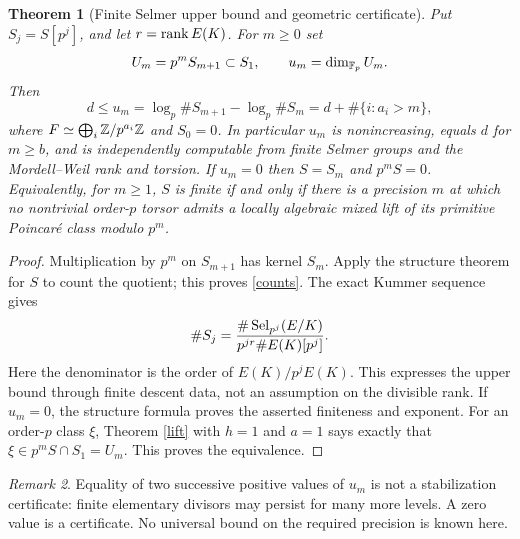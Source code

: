 \documentclass[11pt,a4paper]{article}
\newtheorem{theorem}{Theorem}[section]\newtheorem{lemma}[theorem]{Lemma}\newtheorem{corollary}[theorem]{Corollary}\newtheorem{proposition}[theorem]{Proposition}
\theoremstyle{remark}\newtheorem{remark}[theorem]{Remark}
\begin{document}
\begin{theorem}[Finite Selmer upper bound and geometric certificate]\label{certificate}
Put $S_j=S[p^j]$, and let $r=\operatorname{rank} E(K)$. For $m\ge0$ set
\[
 U_m=p^mS_{m+1}\subset S_1,\qquad u_m=\dim_{\mathbb F_p}U_m.
\]
Then
\begin{equation}\label{counts}
 d\le u_m=\log_p\#S_{m+1}-\log_p\#S_m
 =d+\#\{i:a_i>m\},
\end{equation}
where $F\simeq\bigoplus_i\mathbb Z/p^{a_i}\mathbb Z$ and $S_0=0$. In particular $u_m$ is nonincreasing, equals $d$ for $m\ge b$, and is independently computable from finite Selmer groups and the Mordell--Weil rank and torsion. If $u_m=0$ then $S=S_m$ and $p^mS=0$. Equivalently, for $m\ge1$, $S$ is finite if and only if there is a precision $m$ at which no nontrivial order-$p$ torsor admits a locally algebraic mixed lift of its primitive Poincar\'e class modulo $p^m$.
\end{theorem}
\begin{proof}
Multiplication by $p^m$ on $S_{m+1}$ has kernel $S_m$. Apply the structure theorem for $S$ to count the quotient; this proves \eqref{counts}. The exact Kummer sequence gives
\[\#S_j=\frac{\#\operatorname{Sel}_{p^j}(E/K)}{p^{jr}\#E(K)[p^j]}.\]
Here the denominator is the order of $E(K)/p^jE(K)$. This expresses the upper bound through finite descent data, not an assumption on the divisible rank. If $u_m=0$, the structure formula proves the asserted finiteness and exponent. For an order-$p$ class $\xi$, Theorem \ref{lift} with $h=1$ and $a=1$ says exactly that $\xi\in p^mS\cap S_1=U_m$. This proves the equivalence.
\end{proof}
\begin{remark}
Equality of two successive positive values of $u_m$ is not a stabilization certificate: finite elementary divisors may persist for many more levels. A zero value is a certificate. No universal bound on the required precision is known here.
\end{remark}
\end{document}
